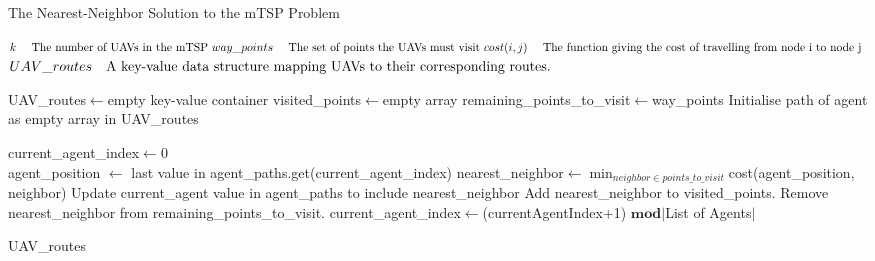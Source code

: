 \begin{algorithm}
\caption{The Nearest-Neighbor Solution to the mTSP Problem}
\label{alg:NNHeuristic}
\begin{algorithmic}[1]
\renewcommand{\algorithmicrequire}{\textbf{Input:}}
\renewcommand{\algorithmicensure}{\textbf{Output:}}

\REQUIRE$ \newline k \quad \text{ The number of UAVs in the mTSP }
\newline way\_points \quad \text{ The set of points the UAVs must visit }
\newline cost(i,j) \quad \text{ The function giving the cost of travelling from node i to node j }
$
\ENSURE $ \newline UAV\_routes \quad \text{A key-value data structure mapping UAVs to their corresponding routes.}
$

\hfill\pagebreak

\STATE UAV\_routes$\leftarrow$empty key-value container
\STATE visited\_points$\leftarrow$empty array
\STATE remaining\_points\_to\_visit$\leftarrow$way\_points
\STATE Initialise path of agent as empty array in UAV\_routes
\ENDFOR

current\_agent\_index$\leftarrow$0\\
\hfill\pagebreak
{}
\STATE agent\_position $\leftarrow$ last value in agent\_paths.get(current\_agent\_index)
\STATE nearest\_neighbor$\leftarrow$\(\displaystyle \min_{neighbor \in points\_to\_visit}\)cost(agent\_position, neighbor)
\STATE Update current\_agent value in agent\_paths to include nearest\_neighbor
\STATE Add nearest\_neighbor to visited\_points.
\STATE Remove nearest\_neighbor from remaining\_points\_to\_visit.
\STATE current\_agent\_index$\leftarrow$(currentAgentIndex+1) $\mathbf{mod}$$\vert$List of Agents$\vert$



\ENDWHILE
\RETURN UAV\_routes
\end{algorithmic} 
\end{algorithm}


